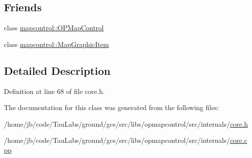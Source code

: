 \subsection*{\-Friends}
\begin{DoxyCompactItemize}
\item 
class \hyperlink{group___o_p_map_widget_ga88abf786b489e97fc16ff6c07da3626e}{mapcontrol\-::\-O\-P\-Map\-Control}
\item 
class \hyperlink{group___o_p_map_widget_ga4fb537bcd209fc77cf5b8c9e38360c07}{mapcontrol\-::\-Map\-Graphic\-Item}
\end{DoxyCompactItemize}


\subsection{\-Detailed \-Description}


\-Definition at line 68 of file core.\-h.



\-The documentation for this class was generated from the following files\-:\begin{DoxyCompactItemize}
\item 
/home/jb/code/\-Tau\-Labs/ground/gcs/src/libs/opmapcontrol/src/internals/\hyperlink{core_8h}{core.\-h}\item 
/home/jb/code/\-Tau\-Labs/ground/gcs/src/libs/opmapcontrol/src/internals/\hyperlink{core_8cpp}{core.\-cpp}\end{DoxyCompactItemize}
